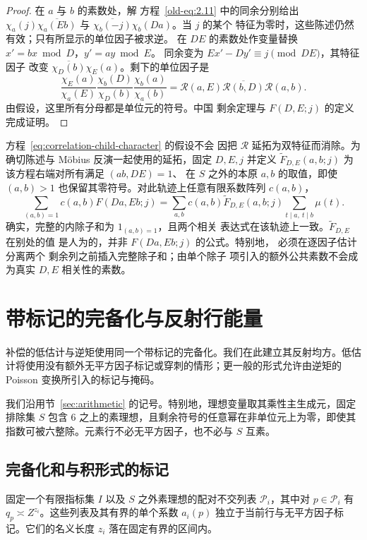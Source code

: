 \documentclass[11pt,a4paper]{article}
\numberwithin{equation}{section}
\numberwithin{figure}{section}
\theoremstyle{definition}
\theoremstyle{remark}
\begin{document}
\begin{proof}
在 $a$ 与 $b$ 的素数处，解
方程~\eqref{old-eq:2.11} 中的同余分别给出
$\chi_a(j)\overline{\chi_a(Eb)}$ 与
$\overline{\chi_b(-j)}\chi_b(Da)$。当 $j$ 的某个
特征为零时，这些陈述仍然有效；只有所显示的单位因子被求逆。
在 $DE$ 的素数处作变量替换 $x'=bx\bmod D$，$y'=ay\bmod E$。
同余变为 $Ex'-Dy'\equiv j\pmod{DE}$，其特征因子
改变 $\overline{\chi_D(b)}\chi_E(a)$。剩下的单位因子是
\[
 \frac{\chi_E(a)}{\chi_a(E)}
 \frac{\chi_b(D)}{\chi_D(b)}
 \frac{\chi_b(a)}{\chi_a(b)}
 =\mathcal R(a,E)\overline{\mathcal R(b,D)}\mathcal R(a,b).
\]
由假设，这里所有分母都是单位元的符号。中国
剩余定理与 $F(D,E;j)$ 的定义完成证明。
\end{proof}

方程~\eqref{eq:correlation-child-character} 的假设不会
因把 $\mathcal R$ 延拓为双特征而消除。为确切陈述与
M\"obius 反演一起使用的延拓，固定 $D,E,j$ 并定义
$\widetilde F_{D,E}(a,b;j)$ 为该方程右端对所有满足 $(ab,DE)=1$、
在 $S$ 之外的本原 $a,b$ 的取值，即使
$(a,b)>1$ 也保留其零符号。对此轨迹上任意有限系数阵列 $c(a,b)$，
\[
 \sum_{(a,b)=1}c(a,b)F(Da,Eb;j)
 =\sum_{a,b}c(a,b)\widetilde F_{D,E}(a,b;j)
                \sum_{t\mid a,\ t\mid b}\mu(t).
\]
确实，完整的内除子和为 $1_{(a,b)=1}$，且两个相关
表达式在该轨迹上一致。$\widetilde F_{D,E}$ 在别处的值
是人为的，并非 $F(Da,Eb;j)$ 的公式。特别地，
必须在逐因子估计分离两个
剩余列之前插入完整除子和；由单个除子
项引入的额外公共素数不会成为真实 $D,E$ 相关性的素数。

\section{带标记的完备化与反射行能量}
\label{sec:marked}\label{sec:marked-energy}

补偿的低估计与逆矩使用同一个带标记的完备化。我们在此建立其反射均方。低估计将使用没有额外无平方因子标记或穿刺的情形；更一般的形式允许由逆矩的 Poisson 变换所引入的标记与掩码。

我们沿用节~\ref{sec:arithmetic} 的记号。特别地，理想变量取其乘性主生成元，固定排除集 \(S\) 包含 \(6\) 之上的素理想，且剩余符号的任意幂在非单位元上为零，即使其指数可被六整除。元素行不必无平方因子，也不必与 \(S\) 互素。

\subsection{完备化和与积形式的标记}

固定一个有限指标集 \(I\) 以及 \(S\) 之外素理想的配对不交列表 \(\mathcal P_i\)，其中对 \(p\in\mathcal P_i\) 有 \(q_p\asymp Z^{z_i}\)。这些列表及其有界的单个系数 \(a_i(p)\) 独立于当前行与无平方因子标记。它们的名义长度 \(z_i\) 落在固定有界的区间内。
\end{document}
